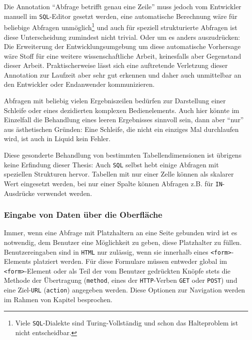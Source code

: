 Die Annotation "`Abfrage betrifft genau eine Zeile"' muss jedoch vom Entwickler manuell im \texttt{SQL}-Editor gesetzt werden, eine automatische Berechnung wäre für beliebige Abfragen unmöglich\footnote{Viele \texttt{SQL}-Dialekte sind Turing-Vollständig und schon das Halteproblem ist nicht entscheidbar.} und auch für speziell strukturierte Abfragen ist diese Unterscheidung zumindest nicht trivial. Oder um es anders auszudrücken: Die Erweiterung der Entwicklungsumgebung um diese automatische Vorhersage wäre Stoff für eine weitere wissenschaftliche Arbeit, keinesfalls aber Gegenstand dieser Arbeit. Praktischerweise lässt sich eine auftretende Verletzung dieser Annotation zur Laufzeit aber sehr gut erkennen und daher auch unmittelbar an den Entwickler oder Endanwender kommunizieren. 

Abfragen mit beliebig vielen Ergebniszeilen bedürfen zur Darstellung einer Schleife oder eines dezidierten komplexen Bedienelements. Auch hier könnte im Einzelfall die Behandlung eines leeren Ergebnisses sinnvoll sein, dann aber "`nur"' aus ästhetischen Gründen: Eine Schleife, die nicht ein einziges Mal durchlaufen wird, ist auch in Liquid kein Fehler.

Diese gesonderte Behandlung von bestimmten Tabellendimensionen ist übrigens keine Erfindung dieser Thesis: Auch \texttt{SQL} selbst hebt einige Abfragen mit speziellen Strukturen hervor. Tabellen mit nur einer Zelle können als skalarer Wert eingesetzt werden, bei nur einer Spalte können Abfragen z.B. für \texttt{IN}-Ausdrücke verwendet werden.

\subsubsection{Eingabe von Daten über die Oberfläche}
\label{sec:design-ui-bind-input}

Immer, wenn eine Abfrage mit Platzhaltern an eine Seite gebunden wird ist es notwendig, dem Benutzer eine Möglichkeit zu geben, diese Platzhalter zu füllen. Benutzereingaben sind in \texttt{HTML} nur zulässig, wenn sie innerhalb  eines \texttt{<form>}-Elements platziert werden. Für diese Formulare müssen entweder global im \texttt{<form>}-Element oder als Teil der vom Benutzer gedrückten Knöpfe stets die Methode der Übertragung (\texttt{method}, eines der \texttt{HTTP}-Verben \texttt{GET} oder \texttt{POST}) und eine Ziel-\texttt{URL} (\texttt{action}) angegeben werden. Diese Optionen zur Navigation werden im Rahmen von Kapitel  besprochen.

